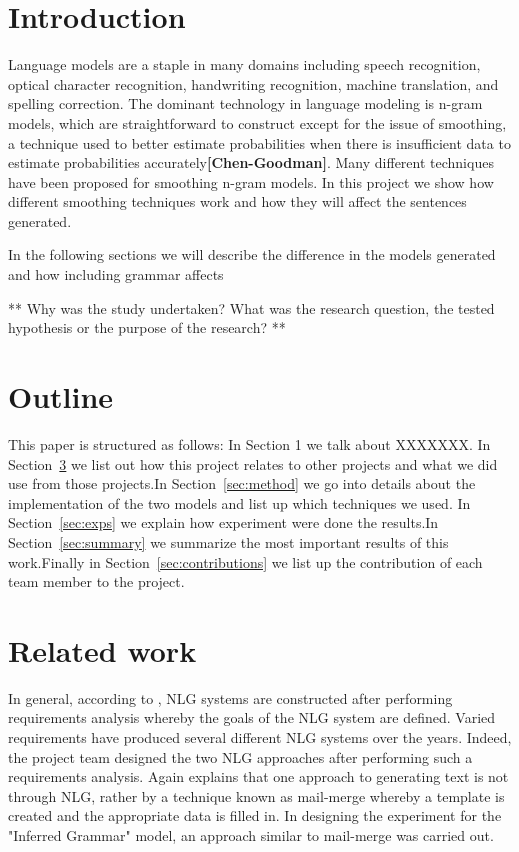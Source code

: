 \documentclass[a4paper,12pt]{article}
\begin{document}
\section{Introduction} %
\label{sec:intro}

Language models are a staple in many domains including speech recognition, optical character
recognition, handwriting recognition, machine translation, and spelling correction. The dominant technology in language modeling is n-gram models, which are straightforward to construct except for the issue of smoothing, a technique used to better estimate probabilities when there is insufficient data to estimate probabilities accurately\textbf{[Chen-Goodman]}. Many different techniques have been proposed for smoothing n-gram models. In this project we show how different smoothing techniques work and how they will affect the sentences generated.

In the following sections we will describe the difference in the models generated and how including grammar affects


**
Why was the study undertaken? What was the research question, the tested hypothesis or the purpose of the research?
**


\section{Outline}
This paper is structured as follows: In Section 1 we talk about XXXXXXX. In Section~\ref{sec:relwork} we list out how this project relates to other projects and what we did use from those projects.In Section~\ref{sec:method} we go into details about the implementation of the two models and list up which techniques we used. In Section~\ref{sec:exps} we explain how experiment were done the results.In Section~\ref{sec:summary} we summarize the most important results of this work.Finally in Section~\ref{sec:contributions} we list up the contribution of each team member to the project.

\section{Related work}
\label{sec:relwork}

In general, according to \cite{Reiter:2000:BNL:331955}, NLG systems are constructed after performing requirements analysis whereby the goals of the NLG system are defined. Varied requirements have produced several different NLG systems over the years. Indeed, the project team designed the two NLG approaches after performing such a requirements analysis. Again \cite{Reiter:2000:BNL:331955} explains that one approach to generating text is not through NLG, rather by a technique known as mail-merge whereby a template is created and the appropriate data is filled in. In designing the experiment for the "Inferred Grammar" model, an approach similar to mail-merge was carried out.
\end{document}
